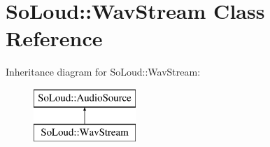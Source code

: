 \hypertarget{class_so_loud_1_1_wav_stream}{}\section{So\+Loud\+:\+:Wav\+Stream Class Reference}
\label{class_so_loud_1_1_wav_stream}
Inheritance diagram for So\+Loud\+:\+:Wav\+Stream\+:\begin{figure}[H]
\begin{center}
\leavevmode
\includegraphics[height=2.000000cm]{class_so_loud_1_1_wav_stream}
\end{center}
\end{figure}
